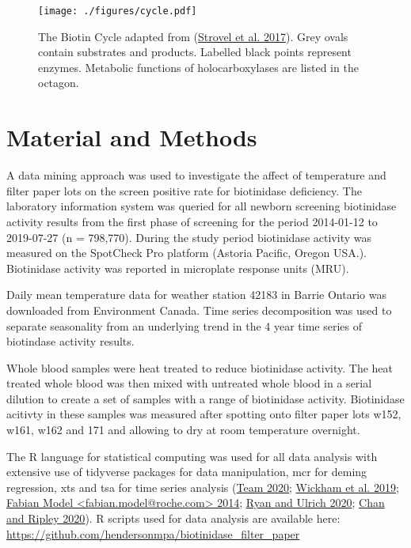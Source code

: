 \documentclass[review]{elsarticle}
\begin{document}
\begin{figure}[htbp]
\centering
\texttt{[image: ./figures/cycle.pdf]}
\caption{\label{fig:org1b71e4a}The Biotin Cycle adapted from (\hyperlink{citeproc_bib_item_5}{Strovel et al. 2017}). Grey ovals contain substrates and products. Labelled black points represent enzymes. Metabolic functions of holocarboxylases are listed in the octagon.}
\end{figure}

\section*{Material and Methods}
\label{sec:org0cfe420}
A data mining approach was used to investigate the affect of
temperature and filter paper lots on the screen positive rate for
biotinidase deficiency. The laboratory information system was queried
for all newborn screening biotinidase activity results from the first
phase of screening for the period 2014-01-12 to 2019-07-27 (n =
798,770). During the study period biotinidase activity was measured on
the SpotCheck Pro platform (Astoria Pacific, Oregon USA.). Biotinidase
activity was reported in microplate response units (MRU).

Daily mean temperature data for weather station 42183 in Barrie
Ontario was downloaded from Environment Canada. Time series
decomposition was used to separate seasonality from an underlying
trend in the 4 year time series of biotindase activity results.

Whole blood samples were heat treated to reduce biotinidase
activity. The heat treated whole blood was then mixed with untreated
whole blood in a serial dilution to create a set of samples with a
range of biotinidase activity. Biotinidase acitivty in these samples
was measured after spotting onto filter paper lots w152, w161, w162
and 171 and allowing to dry at room temperature overnight.

The R language for statistical computing was used for all data
analysis with extensive use of tidyverse packages for data
manipulation, mcr for deming regression, xts and tsa for time series
analysis (\hyperlink{citeproc_bib_item_6}{Team 2020}; \hyperlink{citeproc_bib_item_9}{Wickham et al. 2019}; \hyperlink{citeproc_bib_item_2}{Fabian Model <fabian.model@roche.com> 2014}; \hyperlink{citeproc_bib_item_4}{Ryan and Ulrich 2020}; \hyperlink{citeproc_bib_item_1}{Chan and Ripley 2020}). R scripts used for
data analysis are available here:
\url{https://github.com/hendersonmpa/biotinidase\_filter\_paper}
\end{document}

